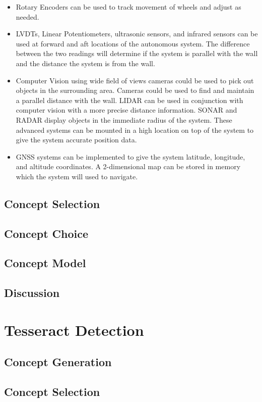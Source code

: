\documentclass[12pt]{article}
\begin{document}
\begin{itemize}
\item Rotary Encoders can be used to track movement of wheels and adjust as needed.
\item LVDTs, Linear Potentiometers, ultrasonic sensors, and infrared sensors can be used at forward and aft locations of the autonomous system. The difference between the two readings will determine if the system is parallel with the wall and the distance the system is from the wall.
\item
Computer Vision using wide field of views cameras could be used to pick out objects in the surrounding area. Cameras could be used to find and maintain a parallel distance with the wall. LIDAR can be used in conjunction with computer vision with a more precise distance information. SONAR and RADAR display objects in the immediate radius of the system. These advanced systems can be mounted in a high location on top of the system to give the system accurate position data.
\item
GNSS systems can be implemented to give the system latitude, longitude, and altitude coordinates. A 2-dimensional map can be stored in memory which the system will used to navigate.
\end{itemize}

\subsection{Concept Selection}
\subsection{Concept Choice}
\subsection{Concept Model}
\subsection{Discussion}

\section{Tesseract Detection}
\subsection{Concept Generation}
\subsection{Concept Selection}
\end{document}
